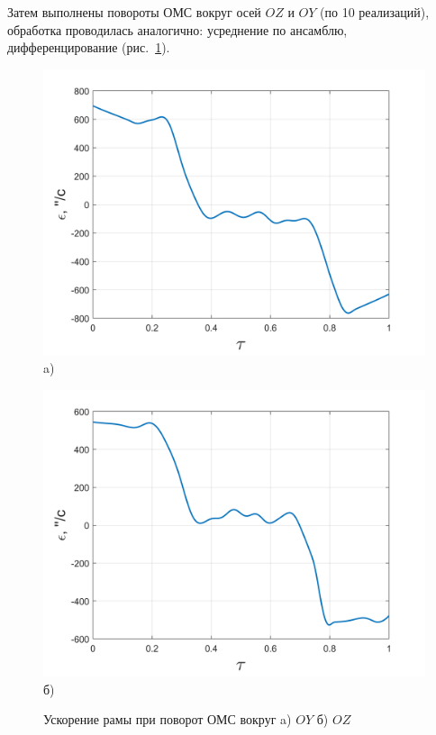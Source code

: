 Затем выполнены повороты ОМС вокруг осей $OZ$ и $OY$ (по 10 реализаций), обработка проводилась аналогично:
усреднение по ансамблю, дифференцирование
(рис.~\cref{fig:oz-gyro}).

\begin{figure}[!h]
	\begin{minipage}[b]{0.49\linewidth}\centering
		\includegraphics[width=0.9\linewidth]{matlab/img/oy-gyro-acc.png}\\[-2pt] a)
	\end{minipage}
	\hfill
	\begin{minipage}[b]{0.49\linewidth}\centering
		\includegraphics[width=0.9\linewidth]{matlab/img/oz-gyro-acc.png}\\[-2pt] б)
	\end{minipage}
	\caption{Ускорение рамы при поворот ОМС вокруг a) $OY$ б) $OZ$}
	\label{fig:oz-gyro}
\end{figure}

